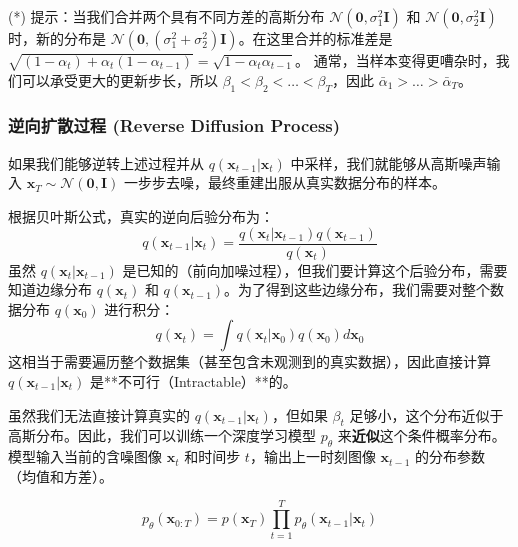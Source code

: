 \documentclass[zihao=-4, fontset=windows]{ctexart}
\begin{document}
(*) 提示：当我们合并两个具有不同方差的高斯分布 $\mathcal{N}(\mathbf{0}, \sigma_{1}^{2} \mathbf{I})$ 和 $\mathcal{N}(\mathbf{0}, \sigma_{2}^{2} \mathbf{I})$ 时，新的分布是 $\mathcal{N}(\mathbf{0},(\sigma_{1}^{2}+\sigma_{2}^{2}) \mathbf{I})$。在这里合并的标准差是 $\sqrt{(1-\alpha_{t})+\alpha_{t}(1-\alpha_{t-1})}=\sqrt{1-\alpha_{t} \alpha_{t-1}}$。
通常，当样本变得更嘈杂时，我们可以承受更大的更新步长，所以 $\beta_{1}<\beta_{2}<\dots<\beta_{T}$，因此 $\bar{\alpha}_{1}>\dots>\bar{\alpha}_{T}$。

\subsubsection{逆向扩散过程 (Reverse Diffusion Process)}

如果我们能够逆转上述过程并从 $q(\mathbf{x}_{t-1} | \mathbf{x}_{t})$ 中采样，我们就能够从高斯噪声输入 $\mathbf{x}_{T} \sim \mathcal{N}(\mathbf{0}, \mathbf{I})$ 一步步去噪，最终重建出服从真实数据分布的样本。

\begin{note}[为什么逆向过程难以直接计算？]
    根据贝叶斯公式，真实的逆向后验分布为：
    \begin{equation}
        q(\mathbf{x}_{t-1} | \mathbf{x}_{t}) = \frac{q(\mathbf{x}_{t} | \mathbf{x}_{t-1}) q(\mathbf{x}_{t-1})}{q(\mathbf{x}_{t})}
    \end{equation}
    虽然 $q(\mathbf{x}_{t} | \mathbf{x}_{t-1})$ 是已知的（前向加噪过程），但我们要计算这个后验分布，需要知道边缘分布 $q(\mathbf{x}_{t})$ 和 $q(\mathbf{x}_{t-1})$。为了得到这些边缘分布，我们需要对整个数据分布 $q(\mathbf{x}_0)$ 进行积分：
    \begin{equation}
        q(\mathbf{x}_t) = \int q(\mathbf{x}_t | \mathbf{x}_0) q(\mathbf{x}_0) d\mathbf{x}_0
    \end{equation}
    这相当于需要遍历整个数据集（甚至包含未观测到的真实数据），因此直接计算 $q(\mathbf{x}_{t-1} | \mathbf{x}_{t})$ 是**不可行（Intractable）**的。
\end{note}

虽然我们无法直接计算真实的 $q(\mathbf{x}_{t-1} | \mathbf{x}_{t})$，但如果 $\beta_{t}$ 足够小，这个分布近似于高斯分布。因此，我们可以训练一个深度学习模型 $p_{\theta}$ 来\textbf{近似}这个条件概率分布。模型输入当前的含噪图像 $\mathbf{x}_t$ 和时间步 $t$，输出上一时刻图像 $\mathbf{x}_{t-1}$ 的分布参数（均值和方差）。

\begin{equation}
p_{\theta}(\mathbf{x}_{0: T})=p(\mathbf{x}_{T}) \prod_{t=1}^{T} p_{\theta}(\mathbf{x}_{t-1} | \mathbf{x}_{t})
\end{equation}
\end{document}
